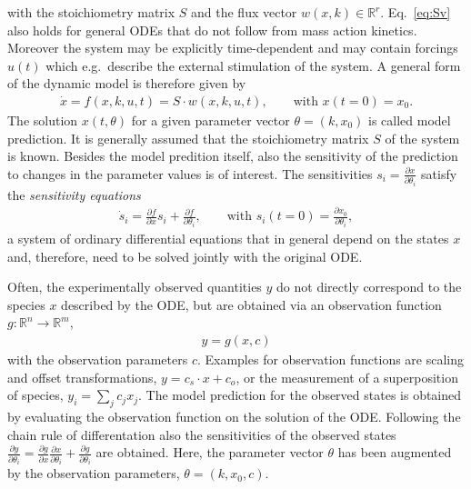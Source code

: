 \documentclass[article]{jss}
\begin{document}
with the stoichiometry matrix $S$
and the flux vector $w(x,k)\in\mathbb R^{r}$.
Eq.~\eqref{eq:Sv} also holds for general ODEs that do not follow from mass action kinetics. Moreover the system may be explicitly time-dependent and may contain forcings $u(t)$ which e.g.~describe the external stimulation of the system. A general form of the dynamic model is therefore given by
\begin{align}
	\dot x = f(x,k,u,t) = S \cdot w(x,k,u,t), \quad\quad \textrm{with }  x(t = 0) = x_0.
\end{align}
The solution $x(t,\theta)$ for a given parameter vector $\theta = (k, x_0)$ is called model prediction. %
It is generally assumed that the stoichiometry matrix $S$ of the system is known.
Besides the model predition itself, also the sensitivity of the prediction to changes in the parameter values is of interest.
The sensitivities $s_i = \frac{\partial x}{\partial \theta_i}$ satisfy the \textit{sensitivity equations}
\begin{align}
	\dot s_i  = \frac{\partial f}{\partial x} s_i + \frac{\partial f}{\partial \theta_i}, \qquad \textrm{with }s_i(t = 0) = \frac{\partial x_0}{\partial \theta_i},
\end{align}
a system of ordinary differential equations that in general depend on the states $x$ and, therefore, need to be solved jointly with the original ODE.

Often, the experimentally observed quantities $y$ do not directly correspond to the species $x$ described by the ODE, but are obtained via an observation function $g: \mathbb{R}^n \rightarrow \mathbb{R}^m$,  \begin{align}
	y = g(x, c)
	\label{eq:observation}
\end{align}
with the observation parameters $c$. Examples for observation functions are scaling and offset transformations, $y = c_s \cdot x + c_o$, or the measurement of a superposition of species, $y_i = \sum_j c_j x_j$. The model prediction for the observed states is obtained by evaluating the observation function on the solution of the ODE. Following the chain rule of differentation also the sensitivities of the observed states $\frac{\partial y}{\partial \theta_i} = \frac{\partial g}{\partial x} \frac{\partial x}{\partial\theta_i}  + \frac{\partial g}{\partial \theta_i}$ are obtained. Here, the parameter vector $\theta$ has been augmented by the observation parameters, $\theta = (k, x_0, c)$.
\end{document}
